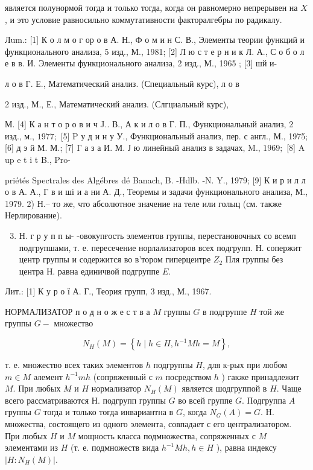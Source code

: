 \documentclass[10pt]{article}
\begin{document}
является полунормой тогда и только тогда, когда он равномерно непрерывен на $X$, и это условие равносильно коммутативности факторалгебры по радикалу.



Лum.: [1] К о л м о г ор о в А. Н., Ф о м и н С. В., Элементы теории функций и функционального анализа, 5 изд., М., 1981; [2] Л ю с т е р н и к Л. А., С о б о л е в в. И. Элементы функционального анализа, 2 изд., М., 1965 ; [3] шй и-

л о в Г. Е., Математический анализ. (Специальный курс), л о в

2 изд., М., Е., Математический анализ. (Слгциальный курс),

М. [4] К а н т о р о в и ч J.. В., А к и л о в Г. П., Функциональный анализ, 2 изд., м., $1977 ;$ [5] P у д и н у У., Функциональный анализ, пер. с англ., М., 1975; [6] д э й М. М.; [7] Г а з а И. М. Ј ю линейный анализ в задачах, M., $1969 ;$ [8] A up e t i t B., Pro-

priétés Spectrales des Algébres dé Banach, B. -Hdlb. -N. Y., 1979; [9] К и р и л л о в А. А., Г в и ші и а ни А. Д., Теоремы и задачи функционального анализа, М., 1979. 2) Н.-- то же, что абсолютное значение на теле или голыц (см. также Нерлирование).



\begin{enumerate}

  \setcounter{enumi}{2}

  \item Н. г р у п п ы- -овокупғость элементов группы, перестановочных со всемп подгрупшами, т. е. пересечение норлализаторов всех подгрупп. Н. сопержит центр группы и содержится во в'тором гиперцеитре $Z_{2}$ Пля группы без центра Н. равна единичвой подгруппе $E$.

\end{enumerate}



Лит.: [1] К у р о ї А. Г., Теория групп, 3 изд., М., 1967.



НОРМАЛИЗАТОР п о д н о ж е с т в а $M$ группы $G$ в подгруппе $H$ той же группы $G-$ множество



\[

N_{H}(M)=\left\{h \mid h \in H, h^{-1} M h=M\right\},

\]



т. е. множество всех таких элементов $h$ подгруппы $H$, для к-рых при любом $m \in M$ әлемент $h^{-1} m h$ (сопряженный с $m$ посредством $h$ ) гакже принадлежит $M$. При любых $M$ и $H$ нормализатор $N_{H}(M)$ является шодгруппой в $H$. Чаще всего рассматриваются $Н$. подгрупп группы $G$ во всей группе $G$. Подгруппа $A$ группы $G$ тогда и только тогда инвариантна в $G$, когда $N_{G}(A)=G$. H. множества, состоящего из одного элемента, совпадает с его централизатором. При любых $H$ и $M$ мощность класса подмножества, сопряженных с $M$ элементами из $H$ (т. е. подмножеств вида $h^{-1} M h, h \in H$ ), равна индексу $\left|H: N_{H}(M)\right|$.
\end{document}
